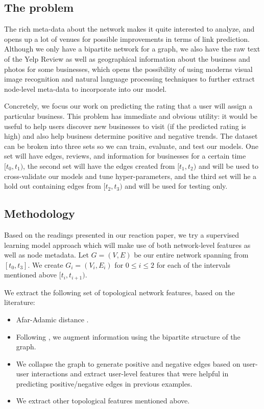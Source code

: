 \documentclass[letterpaper, 11 pt, conference]{ieeeconf}  %
\begin{document}
\subsection{The problem}
The rich meta-data about the network makes it quite interested to analyze, and opens up a lot of venues for possible improvements in terms of link prediction. Although we only have a bipartite network for a graph, we also have the raw text of the Yelp Review as well as geographical information about the business and photos for some businesses, which opens the possibility of using moderns visual image recognition and natural language processing techniques to further extract node-level meta-data to incorporate into our model.

Concretely, we focus our work on predicting the rating that a user will assign a particular business. This problem has immediate and obvious utility: it would be useful to help users discover new businesses to visit (if the predicted rating is high) and also help business determine positive and negative trends. The dataset can be broken into three sets so we can train, evaluate, and test our models. One set will have edges, reviews, and information for businesses for a certain time $[t_0, t_1)$, the second set will have the edges created from $[t_1, t_2)$ and will be used to cross-validate our models and tune hyper-parameters, and the third set will he a hold out containing edges from $[t_2, t_3)$ and will be used for testing only.

\subsection{Methodology}
Based on the readings presented in our reaction paper, we try a supervised learning model approach which will make use of both network-level features as well as node metadata. Let $G = (V,E)$ be our entire network spanning from $[t_0, t_3]$. We create $G_i = (V_i, E_i)$ for $0 \leq i \leq 2$ for each of the intervals mentioned above $[t_i, t_{i+1})$.

We extract the following set of topological network features, based on the literature:
\begin{itemize}
\item Afar-Adamic distance \cite{Adamic01friendsand}.
\item Following \cite{5562752}, we augment information using the bipartite structure of the graph.
\item We collapse the graph to generate positive and negative edges based on user-user interactions and extract user-level features that were helpful in predicting positive/negative edges in previous examples.
\item We extract other topological features mentioned above.
\end{itemize}
\end{document}
